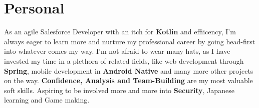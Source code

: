 \documentclass[10pt,a4paper,hidelinks]{moderncv}
\begin{document}
\hfill

\section{Personal}
As an agile Salesforce Developer with an itch for \textbf{Kotlin} and effiicency, I'm always eager to learn more and nurture my professional career by going head-first into whatever comes my way. I'm not afraid to wear many hats, as I have invested my time in a plethora of related fields, like web development through  \textbf{Spring}, mobile development in \textbf{Android Native} and many more other projects on the way. \textbf{Confidence, Analysis and Team-Building} are my most valuable soft skills. Aspiring to be involved more and more into \textbf{Security}, Japanese learning and Game making.
\closesection{}
\end{document}
